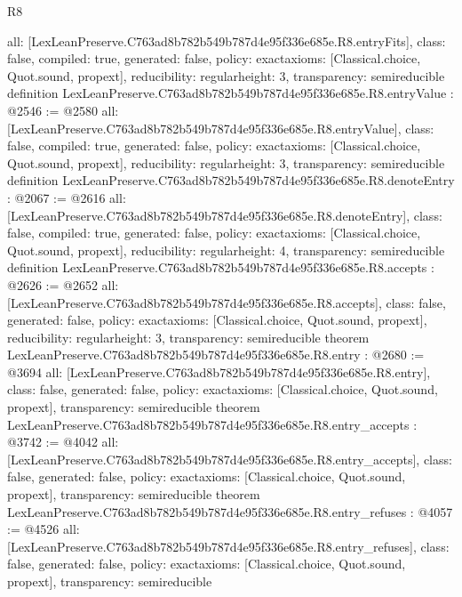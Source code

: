 \begin{lexlean}{R8}
\begin{coremodule}
{  all: [LexLeanPreserve.C763ad8b782b549b787d4e95f336e685e.R8.entryFits],
  class: false,
  compiled: true,
  generated: false,
  policy: exact{axioms: [Classical.choice, Quot.sound, propext]},
  reducibility: regular{height: 3},
  transparency: semireducible
}
definition LexLeanPreserve.C763ad8b782b549b787d4e95f336e685e.R8.entryValue : @2546 := @2580 {
  all: [LexLeanPreserve.C763ad8b782b549b787d4e95f336e685e.R8.entryValue],
  class: false,
  compiled: true,
  generated: false,
  policy: exact{axioms: [Classical.choice, Quot.sound, propext]},
  reducibility: regular{height: 3},
  transparency: semireducible
}
definition LexLeanPreserve.C763ad8b782b549b787d4e95f336e685e.R8.denoteEntry : @2067 := @2616 {
  all: [LexLeanPreserve.C763ad8b782b549b787d4e95f336e685e.R8.denoteEntry],
  class: false,
  compiled: true,
  generated: false,
  policy: exact{axioms: [Classical.choice, Quot.sound, propext]},
  reducibility: regular{height: 4},
  transparency: semireducible
}
definition LexLeanPreserve.C763ad8b782b549b787d4e95f336e685e.R8.accepts : @2626 := @2652 {
  all: [LexLeanPreserve.C763ad8b782b549b787d4e95f336e685e.R8.accepts],
  class: false,
  generated: false,
  policy: exact{axioms: [Classical.choice, Quot.sound, propext]},
  reducibility: regular{height: 3},
  transparency: semireducible
}
theorem LexLeanPreserve.C763ad8b782b549b787d4e95f336e685e.R8.entry : @2680 := @3694 {
  all: [LexLeanPreserve.C763ad8b782b549b787d4e95f336e685e.R8.entry],
  class: false,
  generated: false,
  policy: exact{axioms: [Classical.choice, Quot.sound, propext]},
  transparency: semireducible
}
theorem LexLeanPreserve.C763ad8b782b549b787d4e95f336e685e.R8.entry_accepts : @3742 := @4042 {
  all: [LexLeanPreserve.C763ad8b782b549b787d4e95f336e685e.R8.entry_accepts],
  class: false,
  generated: false,
  policy: exact{axioms: [Classical.choice, Quot.sound, propext]},
  transparency: semireducible
}
theorem LexLeanPreserve.C763ad8b782b549b787d4e95f336e685e.R8.entry_refuses : @4057 := @4526 {
  all: [LexLeanPreserve.C763ad8b782b549b787d4e95f336e685e.R8.entry_refuses],
  class: false,
  generated: false,
  policy: exact{axioms: [Classical.choice, Quot.sound, propext]},
  transparency: semireducible
}


\end{coremodule}
\end{lexlean}
